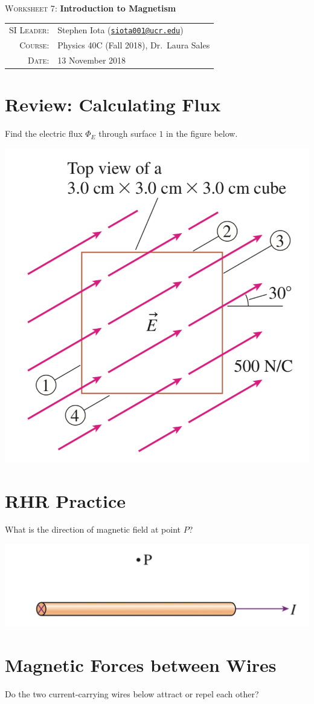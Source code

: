 \documentclass[12pt]{article}
\newcommand{\email}[1]{\texttt{\href{mailto:#1}{#1}}}
\begin{document}
\begin{center}

\Large{\textsc{Worksheet 7}: \textbf{Introduction to Magnetism}}

\end{center}

\vspace{.5mm}


\begin{tabular}{rl}
\textsc{SI Leader}:
&
Stephen Iota (\email{siota001@ucr.edu})
\\
\textsc{Course}:
&
Physics 40C (Fall 2018), Dr.~Laura Sales
\\
\textsc{Date}:
&
13 November 2018
\end{tabular}


\section{Review: Calculating Flux}
Find the electric flux $\Phi_E$ through surface $1$ in the figure below.
\begin{center}
\includegraphics[width=.3\linewidth]{W7_1}		
\end{center}


\section{RHR Practice}
What is the direction of magnetic field at point $P$?

\includegraphics[width=.4\linewidth]{W7_2}

\section{Magnetic Forces between Wires}
Do the two current-carrying wires below attract or repel each other?
\end{document}
